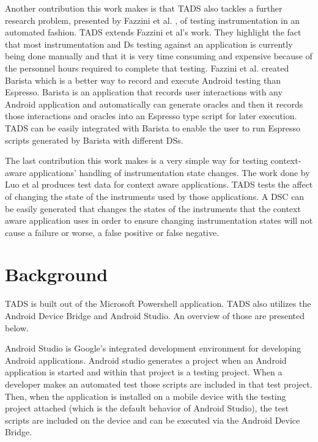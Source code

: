 Another contribution this work makes is that TADS also tackles a further research problem, presented by Fazzini et al. \cite{7927971}, of testing instrumentation in an automated fashion.  TADS extends Fazzini et al's work.  They highlight the fact that most instrumentation and Ds testing against an application is currently being done manually and that it is very time consuming and expensive because of the personnel hours required to complete that testing.  Fazzini et al. created Barista which is a better way to record and execute Android testing than Espresso.  Barista is an application that records user interactions with any Android application and automatically can generate oracles and then it records those interactions and oracles into an Espresso type script for later execution.  TADS can be easily integrated with Barista to enable the user to run Espresso scripts generated by Barista with different DSs.

The last contribution this work makes is a very simple way for testing context-aware applications' handling of instrumentation state changes. The work done by Luo et al \cite{Luo:2017:TLT:3139486.3130945} produces test data for context aware applications.  TADS tests the affect of changing the state of the instruments used by those applications.  A DSC can be easily generated that changes the states of the instruments that the context aware application uses in order to ensure changing instrumentation states will not cause a failure or worse, a false positive or false negative.

\section{Background}
TADS is built out of the Microsoft Powershell application.  TADS also utilizes the Android Device Bridge and Android Studio.  An overview of those are presented below.

Android Studio is Google's integrated development environment for developing Android applications.  Android studio generates a project when an Android application is started and within that project is a testing project.  When a developer makes an automated test those scripts are included in that test project.  Then, when the application is installed on a mobile device with the testing project attached (which is the default behavior of Android Studio), the test scripts are included on the device and can be executed via the Android Device Bridge.  

